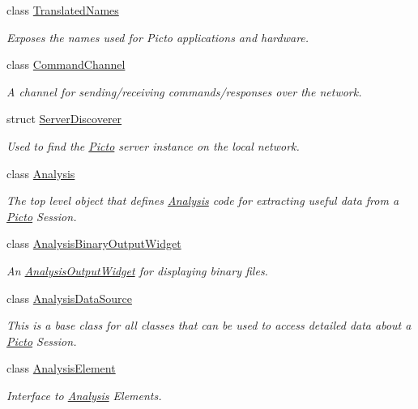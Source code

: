 \begin{DoxyCompactItemize}
class \hyperlink{class_picto_1_1_translated_names}{Translated\-Names}
\begin{DoxyCompactList}\small\item\em Exposes the names used for Picto applications and hardware. \end{DoxyCompactList}\item 
class \hyperlink{class_picto_1_1_command_channel}{Command\-Channel}
\begin{DoxyCompactList}\small\item\em A channel for sending/receiving commands/responses over the network. \end{DoxyCompactList}\item 
struct \hyperlink{struct_picto_1_1_server_discoverer}{Server\-Discoverer}
\begin{DoxyCompactList}\small\item\em Used to find the \hyperlink{namespace_picto}{Picto} server instance on the local network. \end{DoxyCompactList}\item 
class \hyperlink{class_picto_1_1_analysis}{Analysis}
\begin{DoxyCompactList}\small\item\em The top level object that defines \hyperlink{class_picto_1_1_analysis}{Analysis} code for extracting useful data from a \hyperlink{namespace_picto}{Picto} Session. \end{DoxyCompactList}\item 
class \hyperlink{class_picto_1_1_analysis_binary_output_widget}{Analysis\-Binary\-Output\-Widget}
\begin{DoxyCompactList}\small\item\em An \hyperlink{class_picto_1_1_analysis_output_widget}{Analysis\-Output\-Widget} for displaying binary files. \end{DoxyCompactList}\item 
class \hyperlink{class_picto_1_1_analysis_data_source}{Analysis\-Data\-Source}
\begin{DoxyCompactList}\small\item\em This is a base class for all classes that can be used to access detailed data about a \hyperlink{namespace_picto}{Picto} Session. \end{DoxyCompactList}\item 
class \hyperlink{class_picto_1_1_analysis_element}{Analysis\-Element}
\begin{DoxyCompactList}\small\item\em Interface to \hyperlink{class_picto_1_1_analysis}{Analysis} Elements. \end{DoxyCompactList}\item 

\end{DoxyCompactItemize}

